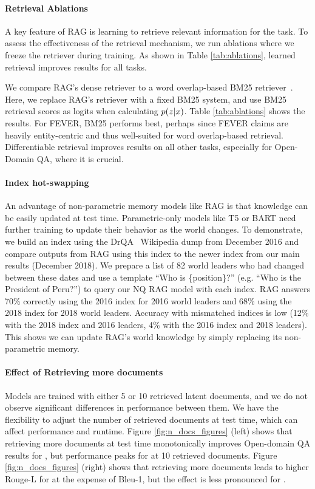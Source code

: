 \paragraph{Retrieval Ablations} A key feature of RAG is learning to retrieve relevant information for the task.
To assess the effectiveness of the retrieval mechanism, we run ablations where we freeze the retriever during training.
As shown in Table \ref{tab:ablations}, learned retrieval improves results for all tasks.

We compare RAG's dense retriever to a word overlap-based BM25 retriever~\cite{robertson2009bm25}. Here, we replace RAG's retriever with a fixed BM25 system, and use BM25 retrieval scores as logits when calculating $p(z|x)$. Table \ref{tab:ablations}
shows the results.
For FEVER, BM25 performs best, perhaps since FEVER claims are heavily entity-centric and thus well-suited for word overlap-based retrieval.
Differentiable retrieval improves results on all other tasks, especially for Open-Domain QA, where it is crucial.


\paragraph{Index hot-swapping}An advantage of non-parametric memory models like RAG is that knowledge can be easily updated at test time. Parametric-only models like T5 or BART need further training to update their behavior as the world changes. To demonstrate, we build an index using the DrQA~\cite{chen_reading_2017} Wikipedia dump from December 
2016 and compare outputs from RAG using this index to the newer index from our main results (December 
2018). We prepare a list of 82 world leaders who had changed between these dates and use a template ``Who is \{position\}?'' (e.g. ``Who is the President of Peru?'') to query our NQ RAG model with each index.
RAG answers 70\% correctly using the 2016 index for 2016 world leaders and 68\% using the 2018 index for  2018 world leaders. 
Accuracy with mismatched indices is low 
(12\% with the 2018 index and 2016 leaders, 4\% with the 2016 index and 2018 leaders). 
This shows we can update RAG's world knowledge by simply replacing its 
non-parametric memory.

\paragraph{Effect of Retrieving more documents} 
Models are trained with either 5 or 10 retrieved latent documents, and we do not observe significant differences in performance between them. 
We have the flexibility to adjust the number of retrieved documents at test time, 
which can affect performance and runtime.
Figure \ref{fig:n_docs_figures} (left) shows that retrieving more documents at test time monotonically improves Open-domain QA results for \raganswer{}, but performance peaks for \ragtoken{} at 10 retrieved documents. Figure \ref{fig:n_docs_figures} (right) shows that retrieving more documents leads to higher Rouge-L for \ragtoken{} at the expense of Bleu-1, but the effect is less pronounced for \raganswer{}. 

